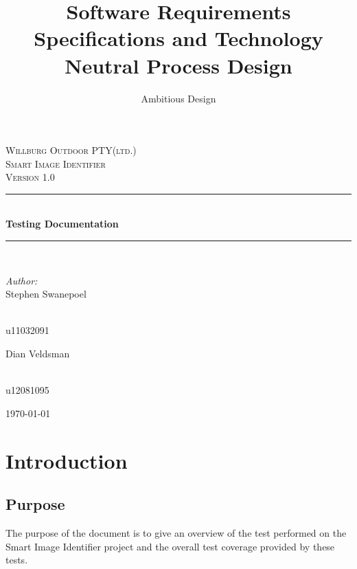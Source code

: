 \documentclass[a4paper,12pt]{report}
\author{Ambitious Design}
\title{ Software Requirements Specifications and Technology Neutral Process Design}
\newcommand{\HRule}{\rule{\linewidth}{0.5mm}}
\begin{document}
\setlength{\parskip}{6pt}

\begin{titlepage}

\begin{center}
\textsc{\LARGE Willburg Outdoor PTY(ltd.)}\\[1.5cm]
\textsc{\Large Smart Image Identifier }\\[1.0cm]
\textsc{\Large Version 1.0 }\\[0.5cm]
\HRule \\[0.4cm]
{ \huge \bfseries Testing Documentation}\\[0.4cm]
\HRule \\[0.4cm]
\begin{minipage}{0.4\textwidth}
\begin{flushleft} \large
\emph{Author:}\\
Stephen {Swanepoel}
\end{flushleft}
\end{minipage}
\begin{minipage}{0.4\textwidth}
\begin{flushright} \large
\emph{} \\
u11032091
\end{flushright}
\end{minipage}
\begin{minipage}{0.4\textwidth}
\begin{flushleft} \large
Dian {Veldsman}
\end{flushleft}
\end{minipage}
\begin{minipage}{0.4\textwidth}
\begin{flushright} \large
\emph{} \\
u12081095
\end{flushright}
\end{minipage}


{\large \today}
\end{center}
\end{titlepage}
\footnotesize
\normalsize

\renewcommand{\thesection}{\arabic{section}}
\newpage

\section {Introduction}
	\subsection {Purpose}
		The purpose of the document is to give an overview of the test performed on the Smart Image Identifier project and the overall test coverage provided by these tests.
\end{document}
